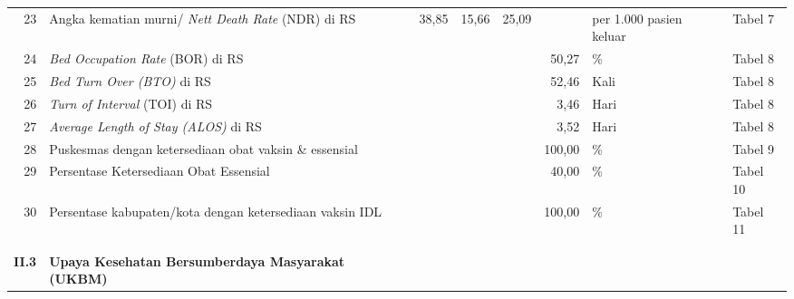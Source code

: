 \begin{small}
\begin{longtable}{rY{12em}rrrrY{5em}Y{5em}}
	 23 & Angka kematian murni/ \emph{Nett Death Rate} (NDR) di RS                              &  38,85 &  15,66 &   25,09 &                   & per 1.000 pasien keluar        & Tabel 7  \\
	                   24 & \emph{Bed Occupation Rate} (BOR) di RS                                                &        &        &         &             50,27 & \%                             & Tabel 8  \\
	 25 & \emph{Bed Turn Over (BTO)} di RS                                                      &        &        &         &             52,46 & Kali                           & Tabel 8  \\
	                   26 & \emph{Turn of Interval} (TOI) di RS                                                   &        &        &         &              3,46 & Hari                           & Tabel 8  \\
	 27 & \emph{Average Length of Stay (ALOS)} di RS                                            &        &        &         &              3,52 & Hari                           & Tabel 8  \\
	                   28 & Puskesmas dengan ketersediaan obat vaksin \& essensial                                &        &        &         &            100,00 & \%                             & Tabel 9  \\
	 29 & Persentase Ketersediaan Obat Essensial                                                &        &        &         &             40,00 & \%                             & Tabel 10 \\
	                   30 & Persentase kabupaten/kota dengan ketersediaan vaksin IDL                              &        &        &         &            100,00 & \%                             & Tabel 11 \\
	                      &                                                                                       &        &        &         &                   &                                &          \\
	                      &                                                                                       &        &        &         &                   &                                &          \\
	        \textbf{II.3} & \textbf{Upaya Kesehatan Bersumberdaya Masyarakat (UKBM)}                              &        &        &         &                   &                                &          \\

\end{longtable}
\end{small}
